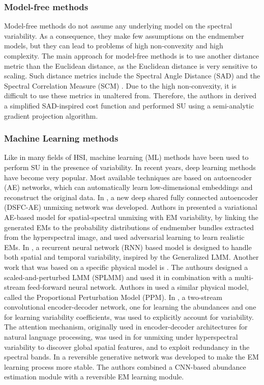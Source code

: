 \subsubsection{Model-free methods}
Model-free methods do not assume any underlying model on the spectral variability. As a consequence, they make few assumptions on the endmember models, but they can lead to problems of high non-convexity and high complexity. The main approach for model-free methods is to use another distance metric than the Euclidean distance, as the Euclidean distance is very sensitive to scaling. Such distance metrics include the Spectral Angle Distance (SAD) and the Spectral Correlation Measure (SCM) \cite{chen_generalization_2009}. Due to the high non-convexity, it is difficult to use these metrics in unaltered from. Therefore, the authors in \cite{kizel_stepwise_2017} derived a simplified SAD-inspired cost function and performed SU using a semi-analytic gradient projection algorithm.


\subsubsection{Machine Learning methods}
Like in many fields of HSI, machine learning (ML) methods have been used to perform SU in the presence of variability. In recent years, deep learning methods have become very popular. Most available techniques are based on autoencoder (AE) networks, which can automatically learn low-dimensional embeddings and reconstruct the original data.
In \cite{chen_dsfc-ae_2024}, a new deep shared fully connected autoencoder (DSFC-AE) unmixing network was developed. 
Authors in \cite{shi_deep_2022} presented a variational AE-based model for spatial-spectral unmixing with EM variability, by linking the generated EMs to the probability distributions of endmember bundles extracted from the hyperspectral image, and used adversarial learning to learn realistic EMs. 
In \cite{borsoi_dynamical_2023}, a recurrent neural network (RNN) based model is designed to handle both spatial and temporal variability, inspired by the Generalized LMM. Another work that was based on a specific physical model is \cite{cheng_hyperspectral_2023}. The authours designed a scaled-and-perturbed LMM (SPLMM) and used it in combination with a multi-stream feed-forward neural network. Authors in \cite{gao_proportional_2024} used a similar physical model, called the Proportional Perturbation Model (PPM).
In \cite{zhang_spectral_2022}, a two-stream convolutional encoder-decoder network, one for learning the abundances and one for learning variability coefficients, was used to explicitly account for variability. The attention mechanism, originally used in encoder-decoder architectures for natural language processing, was used in \cite{su_multi-attention_2023} for unmixing under hyperspectral variability to discover global spatial features, and to exploit redundancy in the spectral bands. 
In \cite{gao_reversible_2024} a reversible generative network was developed to make the EM learning process more stable. The authors combined a CNN-based abundance estimation module with a reversible EM learning module. 


